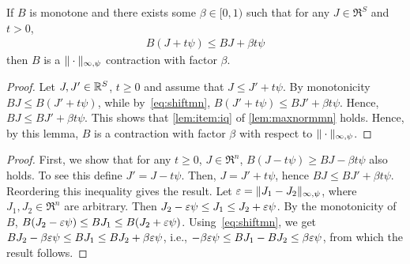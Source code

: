 \documentclass[twocolumn]{IEEEtran}
\begin{document}
\begin{corollary}
\label{maxnormmn}
\label{cor:maxnormmn}
If $B$ is monotone and there exists some $\beta\in [0,1)$ such that for any $J\in \Re^S$ and $t>0$,
\begin{align}
\label{eq:shiftmn}
B( J + t \psi) \le B J + \beta t \psi
\end{align}
then $B$ is a $\|\cdot\|_{\infty,\psi}$ contraction with factor $\beta$.
\end{corollary}
\begin{proof}
Let $J,J'\in \mathbb{R}^S$, $t\ge 0$ and assume that $J\le J' + t \psi$. By monotonicity $BJ \le B(J'+ t \psi)$, while
by~\eqref{eq:shiftmn}, $B(J'+t\psi) \le BJ' + \beta t \psi$. Hence, $BJ \le BJ' + \beta t \psi$.
This shows that \eqref{lem:item:iq} of \cref{lem:maxnormmn} holds.
Hence, by this lemma, $B$ is a contraction with factor $\beta$ with respect to $\|\cdot\|_{\infty,\psi}$.
\end{proof}
\begin{proof}
First, we show that for any $t\ge 0$,  $J\in \Re^n$,
$B( J - t \psi) \ge B J - \beta t \psi$ also holds.
To see this define $J' = J-t\psi$. Then, $J = J'+t\psi$, hence $B J \le B J' + \beta t \psi$. Reordering this inequality gives the result.
Let $\varepsilon = \|J_1 - J_2\|_{\infty,\psi}$, where $J_1,J_2\in \Re^n$ are arbitrary.
Then $J_2 - \varepsilon \psi \le J_1 \le J_2 + \varepsilon \psi$.
By the monotonicity of $B$,
$B(J_2 - \varepsilon \psi) \le B J_1 \le B(J_2 + \varepsilon \psi)$.
Using~\eqref{eq:shiftmn}, we get
$B J_2 - \beta \varepsilon \psi \le B J_1 \le B J_2 + \beta \varepsilon \psi$, i.e., $-\beta \varepsilon \psi \le B J_1 - B J_2 \le \beta \varepsilon \psi$, from which the result follows.
\end{proof}
\fi
\end{document}
